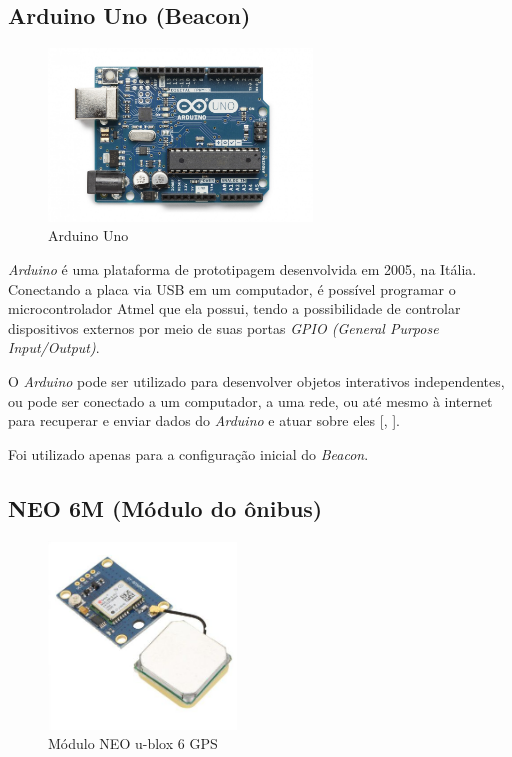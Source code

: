 \documentclass[
	12pt,				%
	oneside,			%
	a4paper,			%
	brazil				%
]{abntex2}
\newcommand{\citecustom}[1]{[\citeauthoronline{#1}, \citeyear{#1}]}
\begin{document}
\subsection{Arduino Uno (Beacon)}

\begin{figure}[H]
\centering
\includegraphics[width=7cm, center]{images/arduino}
\caption{Arduino Uno}
\label{Rotulo}
\end{figure}

\textit{Arduino} é uma plataforma de prototipagem desenvolvida em 2005, na Itália. Conectando a placa via USB em um computador, é possível programar o microcontrolador Atmel que ela possui, tendo a possibilidade de controlar dispositivos externos por meio de suas portas \textit{GPIO (General Purpose Input/Output)}.

O \textit{Arduino} pode ser utilizado para desenvolver objetos interativos independentes, ou pode ser conectado a um computador, a uma rede, ou até mesmo à internet para recuperar e enviar dados do \textit{Arduino} e atuar sobre eles \citecustom{mcroberts2011}.

Foi utilizado apenas para a configuração inicial do \textit{Beacon}.

\newpage

\subsection{NEO 6M (Módulo do ônibus)}

\begin{figure}[H]
\centering
\includegraphics[width=5cm, center]{images/neo-6m}
\caption{Módulo NEO u-blox 6 GPS}
\label{Rotulo}
\end{figure}
\end{document}
